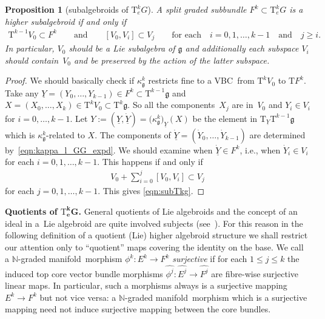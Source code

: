 \documentclass[10pt,a4paper]{amsart}
\newcommand{\grB}{{$\N$-graded manifold}}
\newcommand{\ZM}{{VBC}} %
\newcommand{\N}{\mathbb{N}}
\newcommand{\und}{\underline}
\newcommand{\ra}{\rightarrow}
\newcommand{\T}{\mathrm{T}} %
\newcommand{\TT}[1]{\mathrm{T}^{#1}} %
\newcommand{\core}[1]{\widehat{#1}} %
\newcommand{\g}{\mathfrak{g}} %
\numberwithin{equation}{section}
\newtheorem{prop}[thm]{Proposition}
\theoremstyle{definition}
\begin{document}
\begin{prop}[subalgebroids of $\TT{k}_eG$]\label{prop:sub_alg_TkG} A split graded subbundle $F^k \subset \TT{k}_e G$ is a higher subalgebroid if and only if
\begin{gather}\label{eqn:subTkg}
 \TT{k-1} V_0 \subset F^k \qquad\text{and}\qquad [V_0,V_i]\subset V_j\qquad\text{for each} \quad i=0,1,\hdots,k-1 \quad \text{and} \quad j \geq i.\!\!\!
\end{gather}
 In particular, $V_0$ should be a Lie subalgebra of $\g$ and additionally each subspace $V_i$ should contain~$V_0$ and be preserved by the action of the latter subspace.
\end{prop}
\begin{proof} We should basically check if $\kappa^k_\g$ restricts fine to a \ZM\ from $\TT{k}V_0$ to $\T F^k$.
Take any $\und{Y}=(Y_0, \hdots, Y_{k-1})\in F^k \subset \TT{k-1}\g$ and $X= (X_0,\hdots,X_k)\in \TT{k} V_0 \subset\TT{k}\g$. So all the components~$X_j$ are in~$V_0$ and $Y_i\in V_i$ for $i=0,\hdots,k-1$. Let $Y := (\und{Y}, \dot{\und{Y}}) = \big(\kappa^k_\g\big)_{\und{Y}}(X)$ be the element in $\T_{\und Y}\TT{k-1}\g$ which is $\kappa^k_\g$-related to $X$. The components of $\dot{\und Y}=(\dot Y_0,\hdots,\dot Y_{k-1})$ are determined by~\eqref{eqn:kappa_l_GG_expd}. We should examine when $\dot{\und Y}\in F^k$, i.e., when $\dot Y_i\in V_i$ for each $i=0,1,\hdots,k-1$. This happens if and only if
\begin{gather*}
 V_0 + \sum_{i=0}^j [V_0, V_i] \subset V_j
\end{gather*}
for each $j=0,1,\hdots,k-1$. This gives \eqref{eqn:subTkg}.
\end{proof}

{\bf Quotients of $\boldsymbol{\TT{k}_e G}$.} General quotients of Lie algebroids and the concept of an ideal in a~Lie algebroid are quite involved subjects (see~\cite{Mackenzie_lie_2005}). For this reason in the following definition of a quotient (Lie) higher algebroid structure we shall restrict our attention only to ``quotient'' maps covering the identity on the base. We call a \grB\ morphism $\phi^k\colon E^k\ra F^k$ \emph{surjective} if for each $1\leq j\leq k$ the induced top core vector bundle morphisms $\core{\phi^j}\colon \core{E^j}\ra \core{F^j}$ are fibre-wise surjective linear maps. In particular, such a morphisms always is a surjective mapping $E^k\ra F^k$ but not vice versa: a \grB\ morphism which is a surjective mapping need not induce surjective mapping between the core bundles.
\end{document}
